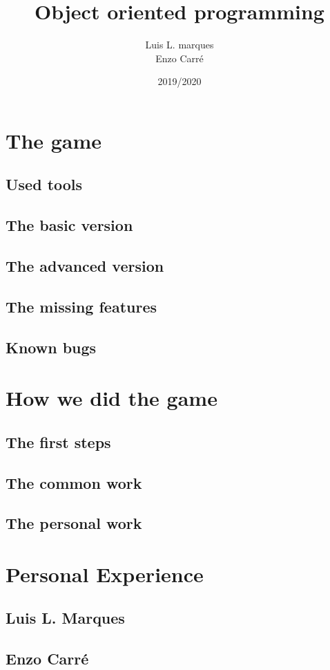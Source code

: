 \documentclass[12pt, a4paper]{report}
\title{Object oriented programming}
\author{Luis L. marques\\Enzo Carré}
\date{2019/2020}
\begin{document}
\maketitle
\tableofcontents

\newpage
\section*{The game}
\subsection*{Used tools}

\subsection*{The basic version}

\subsection*{The advanced version}

\subsection*{The missing features}

\subsection*{Known bugs}

\section*{How we did the game}

\subsection*{The first steps}

\subsection*{The common work}

\subsection*{The personal work}

\section*{Personal Experience}

\subsection*{Luis L. Marques}

\subsection*{Enzo Carré}
\end{document}
